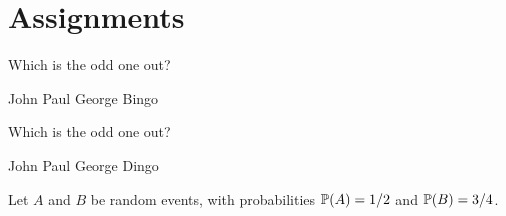 \section{Assignments}
\begin{multiplechoice}\label{mc:beatles}
\begin{questions} 
\question Which is the odd one out?  
	\begin{choices} 
	\choice John %
	\choice Paul
	\choice George
	\correctchoice Bingo
	\end{choices} 
\question Which is the odd one out?  
	\begin{choices} 
	\choice John 
	\choice Paul 
	\choice George 
	\correctchoice Dingo 
	\end{choices} 
\end{questions}
\end{multiplechoice}


\begin{homework}\label{hw:probability}
\begin{questions}
\question
Let $A$ and $B$ be random events, with probabilities $\mathbb{P}(A) = 1/2$ and $\mathbb{P}(B) = 3/4$. 
\end{questions}
\end{homework}

\endinput
